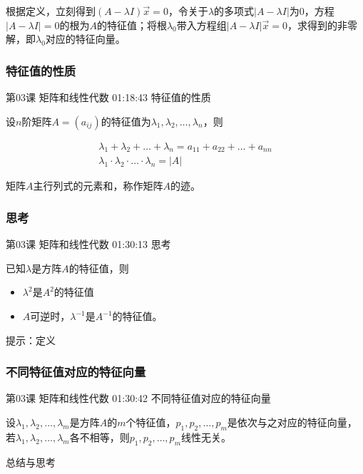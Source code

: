 \documentclass[UTF8]{ctexart}
\begin{document}
根据定义，立刻得到$(A-\lambda I)\vec{x}=0$，令关于$\lambda$的多项式$|A-\lambda I|$为0，方程$|A-\lambda I|=0$的根为$A$的特征值；将根$\lambda_{0}$带入方程组$|A-\lambda I|\vec{x}=0$，求得到的非零解，即$\lambda_{0}$对应的特征向量。

\subsubsection{特征值的性质}

第03课 矩阵和线性代数 01:18:43 特征值的性质

设$n$阶矩阵$A=(a_{ij})$的特征值为$\lambda_{1},\lambda_{2},\dots,\lambda_{n}$，则

\begin{equation}
\begin{aligned}
\lambda_{1}+\lambda_{2}+\dots+\lambda_{n}
=a_{11}+a_{22}+\dots+a_{nn} \\
\lambda_{1} \cdot \lambda_{2} \cdot \dots \cdot \lambda_{n} = |A|
\end{aligned}
\end{equation}

矩阵$A$主行列式的元素和，称作矩阵$A$的迹。


\subsubsection{思考}

第03课 矩阵和线性代数 01:30:13 思考

已知$\lambda$是方阵$A$的特征值，则

\begin{itemize}
\item $\lambda^{2}$是$A^{2}$的特征值
\item $A$可逆时，$\lambda^{-1}$是$A^{-1}$的特征值。
\end{itemize}

提示：定义

\subsubsection{不同特征值对应的特征向量}

第03课 矩阵和线性代数 01:30:42 不同特征值对应的特征向量

设$\lambda_{1},\lambda_{2},\dots,\lambda_{m}$是方阵$A$的$m$个特征值，$p_{1},p_{2},\dots,p_{m}$是依次与之对应的特征向量，若$\lambda_{1},\lambda_{2},\dots,\lambda_{m}$各不相等，则$p_{1},p_{2},\dots,p_{m}$线性无关。

总结与思考 
\end{document}
